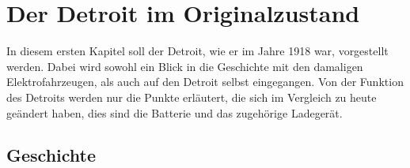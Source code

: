 \chapter{Der Detroit im Originalzustand}
In diesem ersten Kapitel soll der Detroit, wie er im Jahre 1918 war, vorgestellt werden. Dabei wird sowohl ein Blick in die Geschichte mit den damaligen Elektrofahrzeugen, als auch auf den Detroit selbst eingegangen. Von der Funktion des Detroits werden nur die Punkte erläutert, die sich im Vergleich zu heute geändert haben, dies sind die Batterie und das zugehörige Ladegerät.

\section{Geschichte}




\newpage
